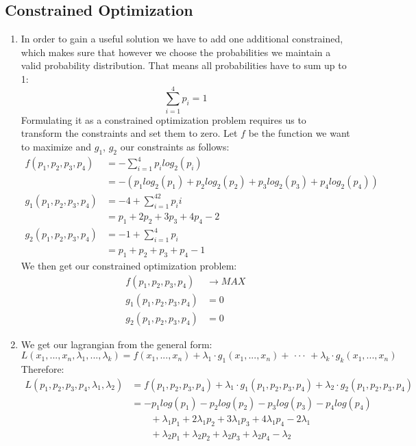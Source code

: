 \documentclass[accentcolor=tud9c]{tudexercise}
\begin{document}
	\subsection{Constrained Optimization}
	\begin{enumerate}
	\item %
	In order to gain a useful solution we have to add one additional constrained, which makes sure that however we choose the probabilities we maintain a valid probability distribution. That means all probabilities have to sum up to 1:
	\[	\sum_{i=1}^4p_{i}=1\]
	Formulating it as a constrained optimization problem requires us to transform the constraints and set them to zero. Let $f$ be the function we want to maximize and $g_1$, $g_2$ our constraints as follows:
	\begin{align*}
	f(p_1,p_2,p_3,p_4) &=-\sum_{i=1}^4p_ilog_2(p_i) \\
	&=-(p_1log_2(p_1)+p_2log_2(p_2)+p_3log_2(p_3)+p_4log_2(p_4)) \\
	g_1(p_1,p_2,p_3,p_4) &=-4+\sum_{i=1}^42p_ii \\
	&= p_1 + 2p_2 + 3p_3 + 4p_4 - 2 \\
	g_2(p_1,p_2,p_3,p_4) &=-1+\sum_{i=1}^4p_i \\
	&= p_1 + p_2 + p_3 + p_4 - 1
	\end{align*}
	We then get our constrained optimization problem:
	\begin{align*}
	f(p_1,p_2,p_3,p_4) & \rightarrow MAX\\
	g_1(p_1,p_2,p_3,p_4) & = 0 \\
	g_2(p_1,p_2,p_3,p_4) & = 0
	\end{align*}
	\item %
	We get our lagrangian from the general form:
	\[
		L(x_1,...,x_n,\lambda_1,...,\lambda_k) = f(x_1,...,x_n) + \lambda_1 \cdot g_1(x_1,...,x_n) +\, \cdot \cdot \cdot \, + \lambda_k \cdot g_k(x_1,...,x_n)
	\]
	Therefore:
	\begin{align*}
		L(p_1,p_2,p_3,p_4,\lambda_1, \lambda_2) &= f(p_1,p_2,p_3,p_4) + \lambda_1 \cdot g_1(p_1,p_2,p_3,p_4) + \lambda_2 \cdot g_2(p_1,p_2,p_3,p_4) \\
		&= -p_1log(p_1) -p_2log(p_2) -p_3log(p_3) -p_4log(p_4) \\
		&\quad \quad + \lambda_1p_1 + 2\lambda_1p_2 + 3\lambda_1p_3 + 4\lambda_1p_4 - 2\lambda_1 \\
		&\quad \quad + \lambda_2p_1 + \lambda_2p_2 + \lambda_2p_3 + \lambda_2p_4 - \lambda_2
	\end{align*}
	

\end{enumerate}
\end{document}
